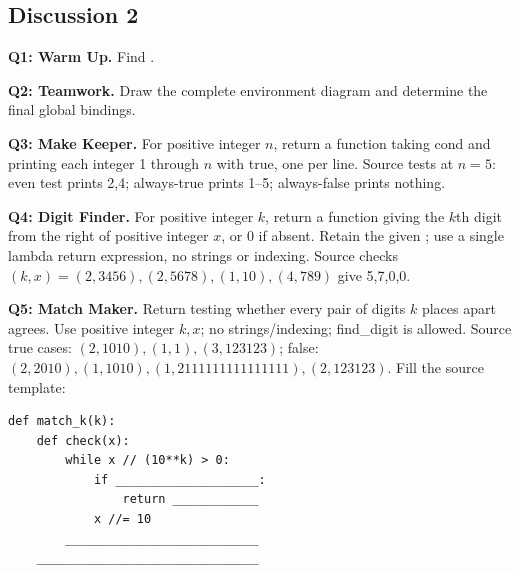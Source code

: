 \subsection{Discussion 2}
\begin{prob}
\textbf{Q1: Warm Up.} Find .\par
{}
\end{prob}
\begin{prob}
\textbf{Q2: Teamwork.} Draw the complete environment diagram and determine the final global bindings.
\end{prob}
\begin{prob}
\textbf{Q3: Make Keeper.} For positive integer $n$, return a function taking cond and printing each integer 1 through $n$ with  true, one per line. Source tests at $n=5$: even test prints 2,4; always-true prints 1--5; always-false prints nothing.\par
{}
\end{prob}
\begin{prob}
\textbf{Q4: Digit Finder.} For positive integer $k$, return a function giving the $k$th digit from the right of positive integer $x$, or 0 if absent. Retain the given ; use a single lambda return expression, no strings or indexing. Source checks $(k,x)=(2,3456),(2,5678),(1,10),(4,789)$ give 5,7,0,0.\par
{}
\end{prob}
\begin{prob}
\textbf{Q5: Match Maker.} Return  testing whether every pair of digits $k$ places apart agrees. Use positive integer $k,x$; no strings/indexing; find\_digit is allowed. Source true cases: $(2,1010),(1,1),(3,123123)$; false: $(2,2010),(1,1010),(1,2111111111111111),(2,123123)$. Fill the source template:
\begin{lstlisting}
def match_k(k):
    def check(x):
        while x // (10**k) > 0:
            if ____________________:
                return ____________
            x //= 10
        ___________________________
    _______________________________
\end{lstlisting}
\end{prob}

